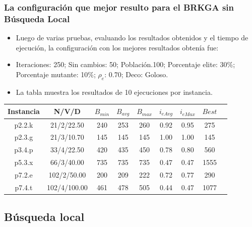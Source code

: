 \documentclass{beamer}
\begin{document}
\begin{frame}
\frametitle{La configuración que mejor resulto para el BRKGA sin Búsqueda Local}

\begin{itemize}
    \item Luego de varias pruebas, evaluando los resultados obtenidos y el tiempo de ejecución, la configuración con los mejores resultados obtenía fue:
    \pause
    \item Iteraciones: 250; Sin cambios: 50; Población.100; Porcentaje elite: 30\%; Porcentaje mutante: 10\%; $\rho_e$: 0.70; Deco: Goloso.
    \pause
    \item La tabla muestra los resultados de 10 ejecuciones por instancia.
\end{itemize}

\begin{table}
\begin{center}
\begin{tabular}{ |c|c|c|c|c|c|c|c|c| } 
\hline
Instancia & N/V/D& $B_{min}$ & $B_{avg}$ & $B_{max}$ & $i_{eAvg}$ & $i_{eMax}$ & $Best$ \\
\hline
p2.2.k & 21/2/22.50 & 240 & 253 & 260 & 0.92 & 0.95 & 275 \\
p2.3.g & 21/3/10.70 & 145 & 145 & 145 & 1.00 & 1.00 & 145 \\
p3.4.p & 33/4/22.50 & 420 & 435 & 450 & 0.78 & 0.80 & 560 \\
p5.3.x & 66/3/40.00 & 735 & 735 & 735 & 0.47 & 0.47 & 1555 \\
p7.2.e & 102/2/50.00 & 200 & 209 & 222 & 0.72 & 0.77 & 290 \\
p7.4.t & 102/4/100.00 & 461 & 478 & 505 & 0.44 & 0.47 & 1077 \\
\hline
\end{tabular}
\end{center}
\label{tab:resultadosBrkgaSinBL}
\end{table}

\end{frame}


\subsection{Búsqueda local}
\end{document}

